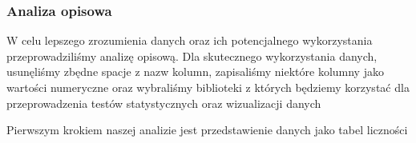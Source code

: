 \documentclass[
]{article}
\newenvironment{Shaded}{\begin{snugshade}}{\end{snugshade}}
\newcommand{\CommentTok}[1]{\textcolor[rgb]{0.56,0.35,0.01}{\textit{#1}}}
\newcommand{\FunctionTok}[1]{\textcolor[rgb]{0.13,0.29,0.53}{\textbf{#1}}}
\newcommand{\NormalTok}[1]{#1}
\newcommand{\OtherTok}[1]{\textcolor[rgb]{0.56,0.35,0.01}{#1}}
\newcommand{\SpecialCharTok}[1]{\textcolor[rgb]{0.81,0.36,0.00}{\textbf{#1}}}
\newcommand{\StringTok}[1]{\textcolor[rgb]{0.31,0.60,0.02}{#1}}
\begin{document}
\subsubsection{Analiza opisowa}\label{analiza-opisowa}

W celu lepszego zrozumienia danych oraz ich potencjalnego wykorzystania
przeprowadziliśmy analizę opisową. Dla skutecznego wykorzystania danych,
usunęliśmy zbędne spacje z nazw kolumn, zapisaliśmy niektóre kolumny
jako wartości numeryczne oraz wybraliśmy biblioteki z których będziemy
korzystać dla przeprowadzenia testów statystycznych oraz wizualizacji
danych

\begin{Shaded}
\end{Shaded}

Pierwszym krokiem naszej analizie jest przedstawienie danych jako tabel
liczności
\end{document}
